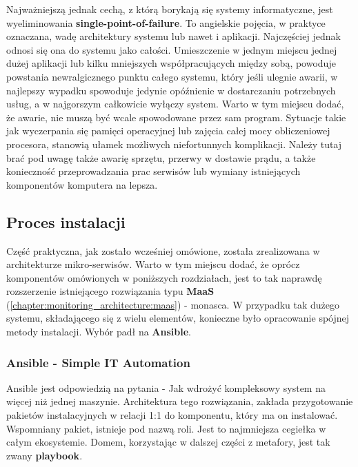 Najważniejszą jednak cechą, z którą borykają się systemy informatyczne, jest wyeliminowania \textbf{single-point-of-failure}.
To angielskie pojęcia, w praktyce oznaczana, wadę architektury systemu lub nawet i aplikacji. Najczęściej jednak odnosi się
ona do systemu jako całości. Umieszczenie w jednym miejscu jednej dużej aplikacji lub kilku mniejszych współpracujących 
między sobą, powoduje powstania newralgicznego punktu całego systemu, który jeśli ulegnie awarii, w najlepszy wypadku spowoduje
jedynie opóźnienie w dostarczaniu potrzebnych usług, a w najgorszym całkowicie wyłączy system. Warto w tym miejscu dodać, że
awarie, nie muszą być wcale spowodowane przez sam program. Sytuacje takie jak wyczerpania się pamięci operacyjnej lub 
zajęcia całej mocy obliczeniowej procesora, stanowią ułamek możliwych niefortunnych komplikacji. Należy tutaj brać pod uwagę
także awarię sprzętu, przerwy w dostawie prądu, a także konieczność przeprowadzania prac serwisów lub wymiany istniejących
komponentów komputera na lepsza.  

\subsection{Proces instalacji}
\label{chapter:application:architecture:installation}
    Część praktyczna, jak zostało wcześniej omówione, została zrealizowana w architekturze mikro-serwisów. Warto w tym miejscu dodać,
    że oprócz komponentów omówionych w poniższych rozdziałach, jest to tak naprawdę rozszerzenie istniejącego rozwiązania typu \textbf{MaaS}
    (\ref{chapter:monitoring_architecture:maas}) - monasca. W przypadku tak dużego systemu, składającego się z wielu elementów, 
    konieczne było opracowanie spójnej metody instalacji. Wybór padł na \textbf{Ansible}. 
    
    \subsubsection{Ansible - Simple IT Automation}
    Ansible jest odpowiedzią na pytania - Jak wdrożyć kompleksowy system na więcej niż jednej maszynie. Architektura tego rozwiązania,
    zakłada przygotowanie pakietów instalacyjnych w relacji 1:1 do komponentu, który ma on instalować. Wspomniany pakiet, istnieje pod nazwą roli.
    Jest to najmniejsza cegiełka w całym ekosystemie. Domem, korzystając w dalszej części z metafory, jest tak zwany \textbf{playbook}.
    
